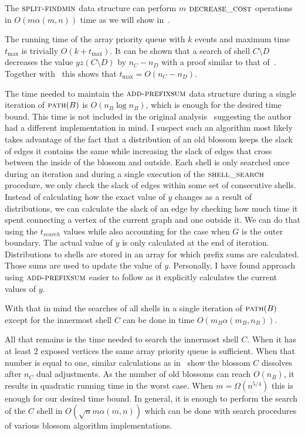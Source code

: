 The $\textsc{split-findmin}$ data structure can perform $m$ $\textsc{decrease\_cost}$ operations in $O(m\alpha(m,n))$ time as we will show in~.

The running time of the array priority queue with $k$ events and maximum time $t_{\max}$ is trivially $O(k + t_{\max})$. It can be shown that a search of shell $C \setminus D$ decreases the value $yz(C \setminus D)$ by $n_C - n_D$ with a proof similar to that of~. Together with~ this shows that $t_{\max} = O(n_C - n_D)$. 

The time needed to maintain the $\textsc{add-prefixsum}$ data structure during a single iteration of $\textsc{path}(B)$ is $O(n_B \log n_B)$, which is enough for the desired time bound. This time is not included in the original analysis~\cite{gabow1984scaling} suggesting the author had a different implementation in mind. I suspect such an algorithm most likely takes advantage of the fact that a distribution of an old blossom keeps the slack of edges it contains the same while increasing the slack of edges that cross between the inside of the blossom and outside. Each shell is only searched once during an iteration and during a single execution of the $\textsc{shell\_search}$ procedure, we only check the slack of edges within some set of consecutive shells. Instead of calculating how the exact value of $y$ changes as a result of distributions, we can calculate the slack of an edge by checking how much time it spent connecting a vertex of the current graph and one outside it. We can do that using the $t_{search}$ values while also accounting for the case when $G$ is the outer boundary. The actual value of $y$ is only calculated at the end of iteration. Distributions to shells are stored in an array for which prefix sums are calculated. Those sums are used to update the value of $y$. Personally, I have found approach using $\textsc{add-prefixsum}$ easier to follow as it explicitly calculates the current values of $y$.

With that in mind the searches of all shells in a single iteration of $\textsc{path}(B)$ except for the innermost shell $C$ can be done in time $O(m_B \alpha(m_B, n_B))$. 

All that remains is the time needed to search the innermost shell $C$. When it has at least 2 exposed vertices the same array priority queue is sufficient. When that number is equal to one, similar calculations as in~ show the blossom $C$ dissolves after $n_C$ dual adjustments. As the number of old blossoms can reach $O(n_B)$, it results in quadratic running time in the worst case. When $m = \Omega(n^{5/4})$ this is enough for our desired time bound. In general, it is enough to perform the search of the $C$ shell in $O(\sqrt{n}m \alpha(m,n))$ which can be done with search procedures of various blossom algorithm implementations.

